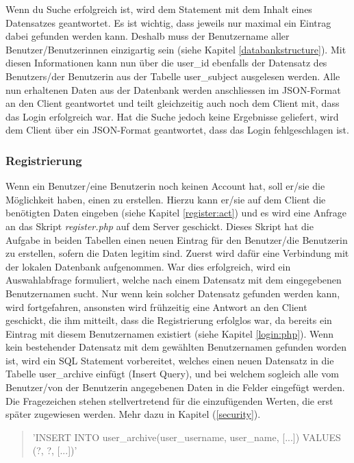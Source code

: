 \documentclass[a4paper,11pt]{report}
\begin{document}
					Wenn du Suche erfolgreich ist, wird dem Statement mit dem Inhalt eines Datensatzes geantwortet. Es ist wichtig, dass jeweils nur maximal ein Eintrag dabei gefunden werden kann. Deshalb muss der Benutzername aller Benutzer/Benutzerinnen einzigartig sein (siehe Kapitel \ref{databankstructure}). Mit diesen Informationen kann nun über die user\_id ebenfalls der Datensatz des Benutzers/der Benutzerin aus der Tabelle user\_subject ausgelesen werden. Alle nun erhaltenen Daten aus der Datenbank werden anschliessen im JSON-Format an den Client geantwortet und teilt gleichzeitig auch noch dem Client mit, dass das Login erfolgreich war. Hat die Suche jedoch keine Ergebnisse geliefert, wird dem Client über ein JSON-Format geantwortet, dass das Login fehlgeschlagen ist.
					\subsubsection{Registrierung}
					Wenn ein Benutzer/eine Benutzerin noch keinen Account hat, soll er/sie die Möglichkeit haben, einen zu erstellen. Hierzu kann er/sie auf dem Client die benötigten Daten eingeben (siehe Kapitel \ref{register:act}) und es wird eine Anfrage an das Skript \emph{register.php} auf dem Server geschickt. Dieses Skript hat die Aufgabe in beiden Tabellen einen neuen Eintrag für den Benutzer/die Benutzerin zu erstellen, sofern die Daten legitim sind. Zuerst wird dafür eine Verbindung mit der lokalen Datenbank aufgenommen. War dies erfolgreich, wird ein Auswahlabfrage formuliert, welche nach einem Datensatz mit dem eingegebenen Benutzernamen sucht. Nur wenn kein solcher Datensatz gefunden werden kann, wird fortgefahren, ansonsten wird frühzeitig eine Antwort an den Client geschickt, die ihm mitteilt, dass die Registrierung erfolglos war, da bereits ein Eintrag mit diesem Benutzernamen existiert (siehe Kapitel \ref{login:php}). Wenn kein bestehender Datensatz mit dem gewählten Benutzernamen gefunden worden ist, wird ein SQL Statement vorbereitet, welches einen neuen Datensatz in die Tabelle user\_archive einfügt (Insert Query), und bei welchem sogleich alle vom Benutzer/von der Benutzerin angegebenen Daten in die Felder eingefügt werden. Die Fragezeichen stehen stellvertretend für die einzufügenden Werten, die erst später zugewiesen werden. Mehr dazu in Kapitel (\ref{security}).
					\begin{quotation}
						{\selectfont\noindent 'INSERT INTO user\_archive(user\_username, user\_name, [...]) VALUES (?, ?, [...])'}
					\end{quotation}
					
\end{document}
